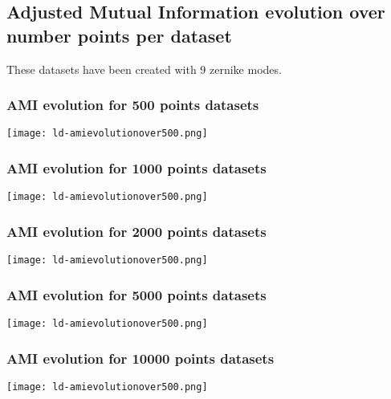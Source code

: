 \subsection{Adjusted Mutual Information evolution over number points per dataset}
	
	These datasets have been created with 9 zernike modes.
	
	\subsubsection{AMI evolution for 500 points datasets}
		\begin{figure*}[ht!]
			\centering
			\texttt{[image: ld-amievolutionover500.png]}
		\end{figure*}
		\FloatBarrier
		
	\subsubsection{AMI evolution for 1000 points datasets}
		\begin{figure*}[ht!]
			\centering
			\texttt{[image: ld-amievolutionover500.png]}
		\end{figure*}
		\FloatBarrier
		
	\subsubsection{AMI evolution for 2000 points datasets}
		\begin{figure*}[ht!]
			\centering
			\texttt{[image: ld-amievolutionover500.png]}
		\end{figure*}
		\FloatBarrier
		
	\subsubsection{AMI evolution for 5000 points datasets}
		\begin{figure*}[ht!]
			\centering
			\texttt{[image: ld-amievolutionover500.png]}
		\end{figure*}
		\FloatBarrier
		
	\subsubsection{AMI evolution for 10000 points datasets}
		\begin{figure*}[ht!]
			\centering
			\texttt{[image: ld-amievolutionover500.png]}
		\end{figure*}
		\FloatBarrier
		
